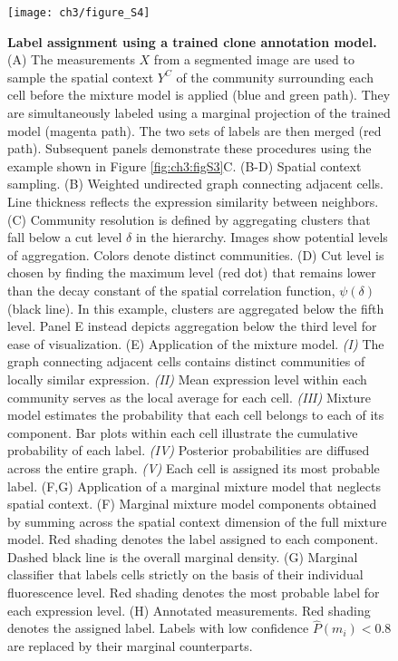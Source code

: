 \begin{figure}[h]
\texttt{[image: ch3/figure\_S4]}
\caption[Label assignment using a trained clone annotation model.]{\textbf{Label assignment using a trained clone annotation model.} (A) The measurements $X$ from a segmented image are used to sample the spatial context $Y^C$ of the community surrounding each cell before the mixture model is applied (blue and green path). They are simultaneously labeled using a marginal projection of the trained model (magenta path). The two sets of labels are then merged (red path). Subsequent panels demonstrate these procedures using the example shown in Figure \ref{fig:ch3:figS3}C. (B-D) Spatial context sampling. (B) Weighted undirected graph connecting adjacent cells. Line thickness reflects the expression similarity between neighbors. (C) Community resolution is defined by aggregating clusters that fall below a cut level $\delta$ in the hierarchy. Images show potential levels of aggregation. Colors denote distinct communities. (D) Cut level is chosen by finding the maximum level (red dot) that remains lower than the decay constant of the spatial correlation function, $\psi(\delta)$ (black line). In this example, clusters are aggregated below the fifth level. Panel E instead depicts aggregation below the third level for ease of visualization. (E) Application of the mixture model. \emph{(I)} The graph connecting adjacent cells contains distinct communities of locally similar expression. \emph{(II)} Mean expression level within each community serves as the local average for each cell. \emph{(III)} Mixture model estimates the probability that each cell belongs to each of its component. Bar plots within each cell illustrate the cumulative probability of each label. \emph{(IV)} Posterior probabilities are diffused across the entire graph. \emph{(V)} Each cell is assigned its most probable label. (F,G) Application of a marginal mixture model that neglects spatial context. (F) Marginal mixture model components obtained by summing across the spatial context dimension of the full mixture model. Red shading denotes the label assigned to each component. Dashed black line is the overall marginal density. (G) Marginal classifier that labels cells strictly on the basis of their individual fluorescence level. Red shading denotes the most probable label for each expression level. (H) Annotated measurements. Red shading denotes the assigned label. Labels with low confidence $\hat{P}(m_i)<0.8$ are replaced by their marginal counterparts.}
\label{fig:ch3:figS4}
\end{figure}

